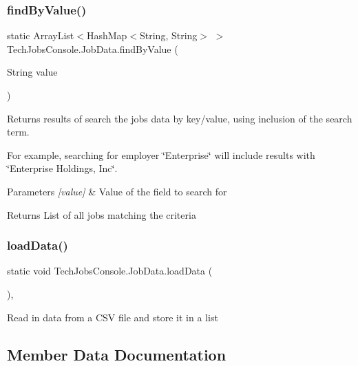 \subsubsection{\texorpdfstring{findByValue()}{findByValue()}}
{\footnotesize\ttfamily static Array\+List$<$Hash\+Map$<$String, String$>$ $>$ Tech\+Jobs\+Console.\+Job\+Data.\+find\+By\+Value (\begin{DoxyParamCaption}\item[{String}]{value }\end{DoxyParamCaption})\hspace{0.3cm}{\ttfamily [static]}}

Returns results of search the jobs data by key/value, using inclusion of the search term.

For example, searching for employer \char`\"{}\+Enterprise\char`\"{} will include results with \char`\"{}\+Enterprise Holdings, Inc\char`\"{}.


\begin{DoxyParams}{Parameters}
{\em \mbox{[}value\mbox{]}} & Value of the field to search for \\
\hline
\end{DoxyParams}
\begin{DoxyReturn}{Returns}
List of all jobs matching the criteria 
\end{DoxyReturn}
\mbox{\label{class_tech_jobs_console_1_1_job_data_a3b1a57401b0a72276b473d0950e6bb71}} 
\subsubsection{\texorpdfstring{loadData()}{loadData()}}
{\footnotesize\ttfamily static void Tech\+Jobs\+Console.\+Job\+Data.\+load\+Data (\begin{DoxyParamCaption}{ }\end{DoxyParamCaption})\hspace{0.3cm}{\ttfamily [static]}, {\ttfamily [private]}}

Read in data from a C\+SV file and store it in a list 

\subsection{Member Data Documentation}
\mbox{\label{class_tech_jobs_console_1_1_job_data_afd5ae8f8b5c6d68e614441cd9a9899ae}} 
